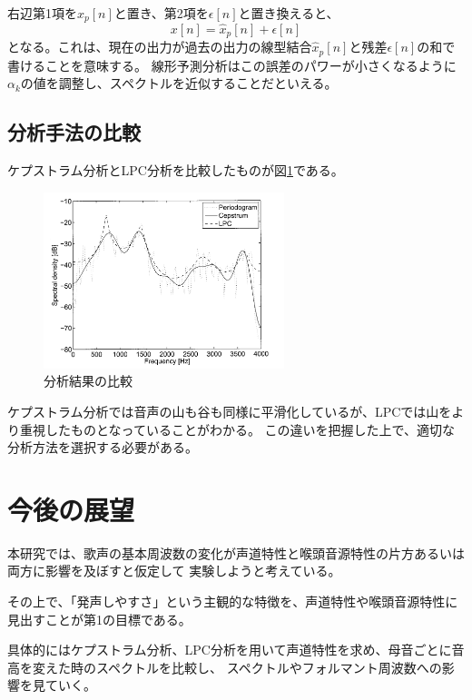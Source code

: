 \documentclass[12ptj,a4j,dvipdfmx,uplatex, titlepage]{jsarticle}
\begin{document}
右辺第1項を$\hat{x}_p[n]$と置き、第2項を$\epsilon[n]$と置き換えると、
\begin{equation}
    x[n] = \hat{x}_p[n] + \epsilon[n]
\end{equation}
となる。これは、現在の出力が過去の出力の線型結合$\hat{x}_p[n]$と残差$\epsilon[n]$の和で書けることを意味する。
線形予測分析はこの誤差のパワーが小さくなるように$\alpha_k$の値を調整し、スペクトルを近似することだといえる。

\subsection{分析手法の比較}

ケプストラム分析とLPC分析を比較したものが図\ref{fig:hikaku}である。

\begin{figure}[htbp]
    \begin{center}
      \includegraphics[clip,width=7.0cm]{比較.png}
      \caption{分析結果の比較\cite{lpc}}
      \label{fig:hikaku}
    \end{center}
\end{figure}

ケプストラム分析では音声の山も谷も同様に平滑化しているが、LPCでは山をより重視したものとなっていることがわかる。
この違いを把握した上で、適切な分析方法を選択する必要がある。



\section{今後の展望}
本研究では、歌声の基本周波数の変化が声道特性と喉頭音源特性の片方あるいは両方に影響を及ぼすと仮定して
実験しようと考えている。

その上で、「発声しやすさ」という主観的な特徴を、声道特性や喉頭音源特性に見出すことが第1の目標である。

具体的にはケプストラム分析、LPC分析を用いて声道特性を求め、母音ごとに音高を変えた時のスペクトルを比較し、
スペクトルやフォルマント周波数への影響を見ていく。
\end{document}
